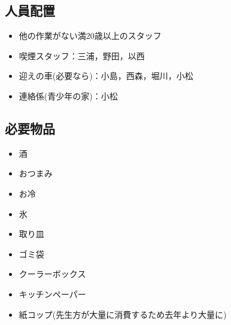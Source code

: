 \subsection{人員配置}
\begin{itemize}
\item 他の作業がない満20歳以上のスタッフ
\item 喫煙スタッフ：三浦，野田，以西
\item 迎えの車(必要なら)：小島，西森，堀川，小松
\item 連絡係(青少年の家)：小松
\end{itemize}


\subsection{必要物品}
\begin{itemize}
  \item 酒
  \item おつまみ
  \item お冷
  \item 氷
  \item 取り皿
  \item ゴミ袋
  \item クーラーボックス
  \item キッチンペーパー
  \item 紙コップ(先生方が大量に消費するため去年より大量に)
\end{itemize}


